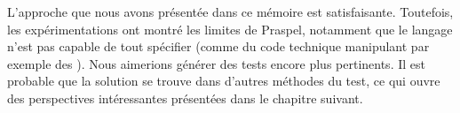 L'approche que nous avons présentée dans ce mémoire est satisfaisante.
Toutefois, les expérimentations ont montré les limites de Praspel, notamment que
le langage n'est pas capable de tout spécifier (comme du code technique
manipulant par exemple des ). Nous aimerions générer des
tests encore plus pertinents. Il est probable que la solution se trouve dans
d'autres méthodes du test, ce qui ouvre des perspectives intéressantes
présentées dans le chapitre suivant.
